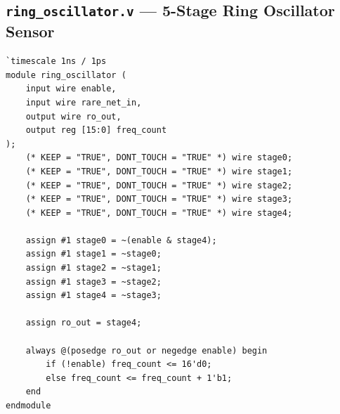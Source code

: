 \documentclass[11pt,a4paper,oneside]{book}
\begin{document}
\subsection{\texttt{ring\_oscillator.v} --- 5-Stage Ring Oscillator Sensor}
\begin{lstlisting}[language=VerilogCustom]
`timescale 1ns / 1ps
module ring_oscillator (
    input wire enable,
    input wire rare_net_in,
    output wire ro_out,
    output reg [15:0] freq_count
);
    (* KEEP = "TRUE", DONT_TOUCH = "TRUE" *) wire stage0;
    (* KEEP = "TRUE", DONT_TOUCH = "TRUE" *) wire stage1;
    (* KEEP = "TRUE", DONT_TOUCH = "TRUE" *) wire stage2;
    (* KEEP = "TRUE", DONT_TOUCH = "TRUE" *) wire stage3;
    (* KEEP = "TRUE", DONT_TOUCH = "TRUE" *) wire stage4;

    assign #1 stage0 = ~(enable & stage4);
    assign #1 stage1 = ~stage0;
    assign #1 stage2 = ~stage1;
    assign #1 stage3 = ~stage2;
    assign #1 stage4 = ~stage3;

    assign ro_out = stage4;

    always @(posedge ro_out or negedge enable) begin
        if (!enable) freq_count <= 16'd0;
        else freq_count <= freq_count + 1'b1;
    end
endmodule
\end{lstlisting}
\end{document}
